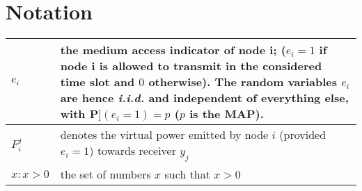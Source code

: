 \section{Notation}
%
\begin{tabular}{ l | p{10cm} }
  $e_i$ & the medium access indicator of node i; ($e_i = 1$ if node i is allowed to transmit in the considered time slot and $0$ otherwise). The random variables $e_i$ are hence \textit{i.i.d.} and independent of everything else, with $\textbf{P}](e_i = 1) = p$ ($p$ is the MAP). \\
  \hline
  $F_i^j$ & denotes the virtual power emitted by node $i$ (provided $e_i = 1$) towards receiver $y_j$ \\
  \hline
  $x:x>0$ & the set of numbers $x$ such that $x>0$ \\
  \hline
\end{tabular}
